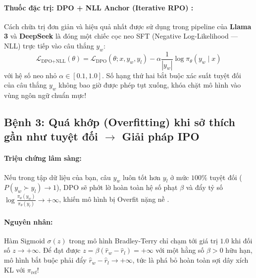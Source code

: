 \paragraph{Thuốc đặc trị: DPO + NLL Anchor (Iterative RPO) \citep{pang2024iterative, pal2024smaug}:}
Cách chữa trị đơn giản và hiệu quả nhất được sử dụng trong pipeline của \textbf{Llama 3} \citep{dubey2024llama} và \textbf{DeepSeek} là đóng một chiếc cọc neo SFT (Negative Log-Likelihood --- NLL) trực tiếp vào câu thắng $y_w$:
\begin{equation}
  \mathcal{L}_{\text{DPO+NLL}}(\theta) = \mathcal{L}_{\text{DPO}}(\theta; x, y_w, y_l) - \alpha \frac{1}{|y_w|} \log \pi_\theta(y_w \mid x)
  \label{eq:dpo_nll_loss}
\end{equation}
với hệ số neo nhỏ $\alpha \in [0.1, 1.0]$. Số hạng thứ hai bắt buộc xác suất tuyệt đối của câu thắng $y_w$ không bao giờ được phép tụt xuống, khóa chặt mô hình vào vùng ngôn ngữ chuẩn mực!

\subsection{Bệnh 3: Quá khớp (Overfitting) khi sở thích gần như tuyệt đối \texorpdfstring{$\longrightarrow$}{->} Giải pháp IPO}

\paragraph{Triệu chứng lâm sàng:}
Nếu trong tập dữ liệu của bạn, câu $y_w$ luôn tốt hơn $y_l$ ở mức $100\%$ tuyệt đối ($P(y_w \succ y_l) \to 1$), DPO sẽ phớt lờ hoàn toàn hệ số phạt $\beta$ và đẩy tỷ số $\log \frac{\pi_\theta(y_w)}{\pi_\theta(y_l)} \to +\infty$, khiến mô hình bị Overfit nặng nề \citep{azar2024general}.

\paragraph{Nguyên nhân:}
Hàm Sigmoid $\sigma(z)$ trong mô hình Bradley-Terry chỉ chạm tới giá trị $1.0$ khi đối số $z \to +\infty$. Để đạt được $z = \beta (\hat{r}_w - \hat{r}_l) = +\infty$ với một hằng số $\beta > 0$ hữu hạn, mô hình bắt buộc phải đẩy $\hat{r}_w - \hat{r}_l \to +\infty$, tức là phá bỏ hoàn toàn sợi dây xích KL với $\pi_{\text{ref}}$!

